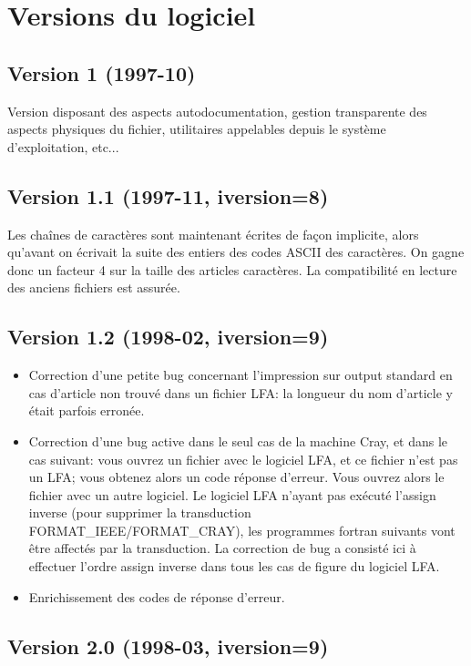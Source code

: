 \documentclass[10pt,french]{book}
\begin{document}
\chapter{Versions du logiciel}

\section*{Version 1 (1997-10)}

\p Version disposant
des aspects autodocumentation,
gestion transparente des aspects physiques du fichier,
utilitaires appelables depuis le système d'exploitation,
etc...

\section*{Version 1.1 (1997-11, iversion=8)}

\p Les chaînes
de caractères sont maintenant écrites de façon implicite,
alors qu'avant on écrivait la suite des entiers des codes
ASCII des caractères. On gagne donc un facteur 4 sur 
la taille des articles caractères. La compatibilité
en lecture des anciens fichiers est assurée.

\section*{Version 1.2 (1998-02, iversion=9)}

\begin{itemize}
	\item Correction d'une petite bug
		concernant l'impression sur output standard en cas
		d'article non trouvé dans un fichier LFA: la longueur
		du nom d'article y était parfois erronée.
	\item Correction d'une bug active dans le seul cas de la machine
		Cray, et dans le cas suivant:
		vous ouvrez 
		un fichier avec le logiciel LFA, et ce fichier n'est pas un LFA;
		vous obtenez alors un code réponse d'erreur. Vous 
		ouvrez alors le fichier avec un autre logiciel. Le logiciel
		LFA n'ayant pas exécuté l'assign inverse (pour supprimer
		la transduction FORMAT\_IEEE/FORMAT\_CRAY), les programmes
		fortran suivants vont être affectés par la transduction.
		La correction de bug a consisté ici à effectuer
		l'ordre assign inverse dans tous les cas de figure du logiciel
		LFA.
	\item Enrichissement des codes de réponse d'erreur.
\end{itemize}
\section*{Version 2.0 (1998-03, iversion=9)}
\end{document}
